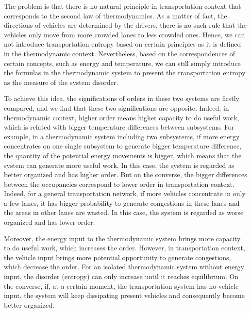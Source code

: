 \documentclass[preprint,authoryear,12pt]{elsarticle}
\begin{document}
The problem is that there is no natural principle in transportation
context that corresponds to the second law of thermodynamics. As a
matter of fact, the directions of vehicles are determined by the
drivers, there is no such rule that the vehicles only move from more
crowded lanes to less crowded ones. Hence, we can not introduce
transportation entropy based on certain principles as it is defined
in the thermodynamic context. Nevertheless, based on the
correspondences of certain concepts, such as energy and temperature,
we can still simply introduce the formulas in the thermodynamic
system to present the transportation entropy as the measure of the
system disorder.

To achieve this idea, the significations of orders in these two
systems are firstly compared, and we find that these two
significations are opposite. Indeed, in thermodynamic context, higher
order means higher capacity to do useful work, which is related with
bigger temperature differences between subsystems. For example, in a
thermodynamic system including two subsystems, if more energy
concentrates on one single subsystem to generate bigger temperature
difference, the quantity of the potential energy movements is bigger,
which means that the system can generate more useful work. In this
case, the system is regarded as better organized and has higher
order. But on the converse, the bigger differences between the
occupancies correspond to lower order in transportation context.
Indeed, for a general transportation network, if more vehicles
concentrate in only a few lanes, it has bigger probability to
generate congestions in these lanes and the areas in other lanes are
wasted. In this case, the system is regarded as worse organized and
has lower order.

Moreover, the energy input to the thermodynamic system brings more
capacity to do useful work, which increases the order. However, in
transportation context, the vehicle input brings more potential
opportunity to generate congestions, which decrease the order. For an
isolated thermodynamic system without energy input, the disorder
(entropy) can only increase until it reaches equilibrium. On the
converse, if, at a certain moment, the transportation system has no
vehicle input, the system will keep dissipating present vehicles and
consequently become better organized.
\end{document}
